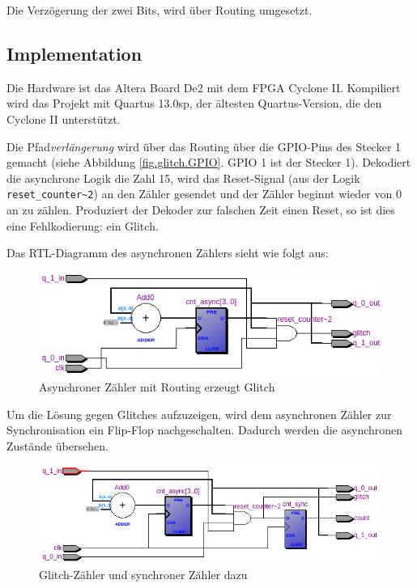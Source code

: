 Die Verzögerung der zwei Bits, wird über Routing umgesetzt. 

\subsection{Implementation} 

Die Hardware ist das Altera Board De2 mit dem FPGA Cyclone II. Kompiliert wird das Projekt mit Quartus 13.0sp, der ältesten Quartus-Version, die den Cyclone II unterstützt.

Die Pfad\textit{verlängerung} wird über das Routing über die GPIO-Pins des Stecker 1 gemacht (siehe Abbildung \ref{fig.glitch.GPIO}. GPIO 1 ist der Stecker 1). Dekodiert die asynchrone Logik die Zahl 15, wird das  Reset-Signal (aus der Logik \lstinline|reset_counter~2|) an den Zähler gesendet und der Zähler beginnt wieder von 0 an zu zählen. Produziert der Dekoder zur falschen Zeit einen Reset, so ist dies eine Fehlkodierung: ein Glitch.

Das RTL-Diagramm des asynchronen Zählers sieht wie folgt aus:
\begin{figure}[H]
	\includegraphics[width=1\textwidth]{images/glitch/RTL_asynchron.png}
	\caption{Asynchroner Zähler mit Routing erzeugt Glitch}
	\label{fig.glitch.RTL_nurGlitch}
\end{figure}

Um die Lösung gegen Glitches aufzuzeigen, wird dem asynchronen Zähler zur Synchronisation ein Flip-Flop nachgeschalten. Dadurch werden die asynchronen Zustände übersehen. 
\begin{figure}[H]
	\includegraphics[width=\textwidth]{images/glitch/glitch_asynch_new.png}
	\caption{Glitch-Zähler und synchroner Zähler dazu}
	\label{fig.glitch.RTL_mit_synchr.Zaehler}
\end{figure}

